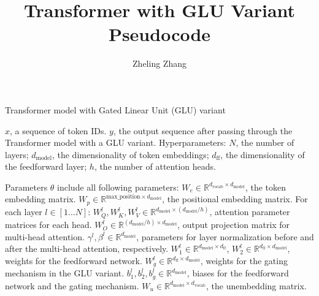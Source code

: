 \documentclass{article}
\title{Transformer with GLU Variant Pseudocode}
\author{Zheling Zhang}
\begin{document}
\maketitle

\begin{algorithm}
\caption{Transformer model with Gated Linear Unit (GLU) variant}
\begin{algorithmic}[1]

\Require $x$, a sequence of token IDs.
\Ensure $y$, the output sequence after passing through the Transformer model with a GLU variant.
\State Hyperparameters: $N$, the number of layers; $d_{\text{model}}$, the dimensionality of token embeddings; $d_{\text{ff}}$, the dimensionality of the feedforward layer; $h$, the number of attention heads.

\State Parameters $\theta$ include all following parameters:
\State \hspace{\algorithmicindent} $W_e \in \mathbb{R}^{d_{\text{vocab}} \times d_{\text{model}}}$, the token embedding matrix.
\State \hspace{\algorithmicindent} $W_p \in \mathbb{R}^{\text{max\_position} \times d_{\text{model}}}$, the positional embedding matrix.
\State \hspace{\algorithmicindent} For each layer $l \in [1...N]$:
\State \hspace{\algorithmicindent}\hspace{\algorithmicindent} $W_Q^l, W_K^l, W_V^l \in \mathbb{R}^{d_{\text{model}} \times (d_{\text{model}}/h)}$, attention parameter matrices for each head.
\State \hspace{\algorithmicindent}\hspace{\algorithmicindent} $W_O^l \in \mathbb{R}^{(d_{\text{model}}/h) \times d_{\text{model}}}$, output projection matrix for multi-head attention.
\State \hspace{\algorithmicindent}\hspace{\algorithmicindent} $\gamma^l, \beta^l \in \mathbb{R}^{d_{\text{model}}}$, parameters for layer normalization before and after the multi-head attention, respectively.
\State \hspace{\algorithmicindent}\hspace{\algorithmicindent} $W_1^l \in \mathbb{R}^{d_{\text{model}} \times d_{\text{ff}}}$, $W_2^l \in \mathbb{R}^{d_{\text{ff}} \times d_{\text{model}}}$, weights for the feedforward network.
\State \hspace{\algorithmicindent}\hspace{\algorithmicindent} $W_g^l \in \mathbb{R}^{d_{\text{ff}} \times d_{\text{model}}}$, weights for the gating mechanism in the GLU variant.
\State \hspace{\algorithmicindent}\hspace{\algorithmicindent} $b_1^l, b_2^l, b_g^l \in \mathbb{R}^{d_{\text{model}}}$, biases for the feedforward network and the gating mechanism.
\State \hspace{\algorithmicindent} $W_u \in \mathbb{R}^{d_{\text{model}} \times d_{\text{vocab}}}$, the unembedding matrix.


\end{algorithmic}
\end{algorithm}
\end{document}
